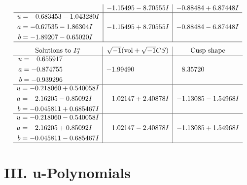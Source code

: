 \documentclass[1p]{elsarticle_modified}
\theoremstyle{definition}
\newcommand{\I}{\sqrt{-1}}
\begin{document}
$$\begin{array}{c|c|c}
 & -1.15495 - 8.70555 I & -0.88484 + 6.87448 I \\ \hline\begin{aligned}
u &= -0.683453 - 1.043280 I \\
a &= -0.67535 - 1.86304 I \\
b &= -1.89207 - 0.65020 I\end{aligned}
 & -1.15495 + 8.70555 I & -0.88484 - 6.87448 I\\
 \hline 
 \end{array}$$\newpage$$\begin{array}{c|c|c}  
\text{Solutions to }I^u_{2}& \I (\text{vol} + \sqrt{-1}CS) & \text{Cusp shape}\\
 \hline 
\begin{aligned}
u &= \phantom{-}0.655917\phantom{ +0.000000I} \\
a &= -0.874755\phantom{ +0.000000I} \\
b &= -0.939296\phantom{ +0.000000I}\end{aligned}
 & -1.99490\phantom{ +0.000000I} & \phantom{-}8.35720\phantom{ +0.000000I} \\ \hline\begin{aligned}
u &= -0.218060 + 0.540058 I \\
a &= \phantom{-}2.16205 - 0.85092 I \\
b &= -0.045811 + 0.685467 I\end{aligned}
 & \phantom{-}1.02147 + 2.40878 I & -1.13085 - 1.54968 I \\ \hline\begin{aligned}
u &= -0.218060 - 0.540058 I \\
a &= \phantom{-}2.16205 + 0.85092 I \\
b &= -0.045811 - 0.685467 I\end{aligned}
 & \phantom{-}1.02147 - 2.40878 I & -1.13085 + 1.54968 I\\
 \hline 
 \end{array}$$\newpage
\newpage\renewcommand{\arraystretch}{1}
\centering \section*{ III. u-Polynomials}
\end{document}
